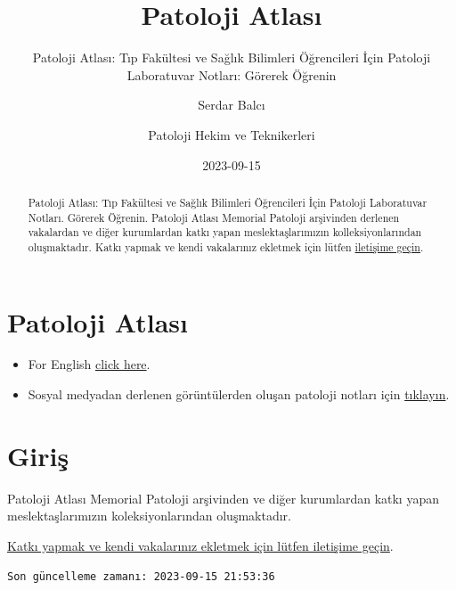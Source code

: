 \documentclass[
  letterpaper,
  DIV=11,
  numbers=noendperiod]{scrreprt}
\title{Patoloji Atlası}
\subtitle{Patoloji Atlası: Tıp Fakültesi ve Sağlık Bilimleri Öğrencileri
İçin Patoloji Laboratuvar Notları: Görerek Öğrenin}
\author{Serdar Balcı \and Patoloji Hekim ve Teknikerleri}
\date{2023-09-15}
\renewcommand*\contentsname{Içindekiler}
\newcommand\contentsname{Içindekiler}
\begin{document}
\maketitle
\begin{abstract}
Patoloji Atlası: Tıp Fakültesi ve Sağlık Bilimleri Öğrencileri İçin
Patoloji Laboratuvar Notları. Görerek Öğrenin. Patoloji Atlası Memorial
Patoloji arşivinden derlenen vakalardan ve diğer kurumlardan katkı yapan
meslektaşlarımızın kolleksiyonlarından oluşmaktadır. Katkı yapmak ve
kendi vakalarınız ekletmek için lütfen
\href{https://www.patolojiatlasi.com/katki.html}{iletişime geçin}.
\end{abstract}
\renewcommand*\contentsname{İçindekiler}
{
\hypersetup{linkcolor=}
\setcounter{tocdepth}{1}
\tableofcontents
}

\chapter*{Patoloji Atlası}\label{sec-patoloji-atlasi}


\begin{itemize}
\item
  For English \href{https://www.histopathologyatlas.com/}{click here}.
\item
  Sosyal medyadan derlenen görüntülerden oluşan patoloji notları için
  \href{https://www.patolojinotlari.com/}{tıklayın}.\\
\end{itemize}


\chapter*{Giriş}\label{sec-giris}


Patoloji Atlası Memorial Patoloji arşivinden ve diğer kurumlardan katkı
yapan meslektaşlarımızın koleksiyonlarından oluşmaktadır.

\href{https://www.patolojiatlasi.com/katki.html}{Katkı yapmak ve kendi
vakalarınız ekletmek için lütfen iletişime geçin}.

\begin{verbatim}
Son güncelleme zamanı: 2023-09-15 21:53:36
\end{verbatim}
\end{document}
